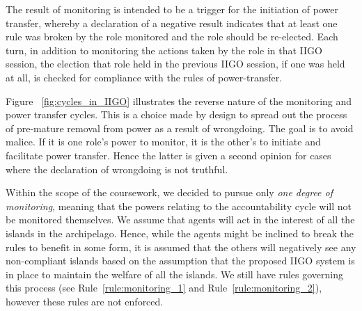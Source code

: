
The result of monitoring is intended to be a trigger for the initiation of power transfer, whereby a declaration of a negative result indicates that at least one rule was broken by the role monitored and the role should be re-elected. Each turn, in addition to monitoring the actions taken by the role in that IIGO session, the election that role held in the previous IIGO session, if one was held at all, is checked for compliance with the rules of power-transfer.

Figure~ \ref{fig:cycles_in_IIGO} illustrates the reverse nature of the monitoring and power transfer cycles. This is a choice made by design to spread out the process of pre-mature removal from power as a result of wrongdoing. The goal is to avoid malice. If it is one role's power to monitor, it is the other's to initiate and facilitate power transfer. Hence the latter is given a second opinion for cases where the declaration of wrongdoing is not truthful.

Within the scope of the coursework, we decided to pursue only \emph{one degree of monitoring}, meaning that the powers relating to the accountability cycle will not be monitored themselves. We assume that agents will act in the interest of all the islands in the archipelago. Hence, while the agents might be inclined to break the rules to benefit in some form, it is assumed that the others will negatively see any non-compliant islands based on the assumption that the proposed IIGO system is in place to maintain the welfare of all the islands. We still have rules governing this process (see Rule~\ref{rule:monitoring_1} and Rule~\ref{rule:monitoring_2}), however these rules are not enforced.

